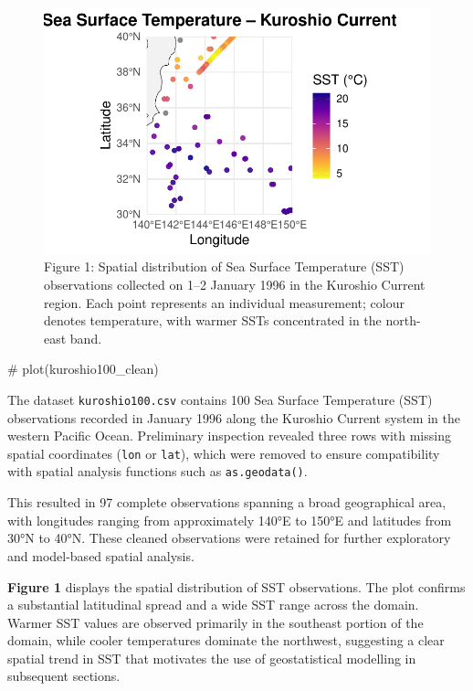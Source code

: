 \documentclass[
  11pt,
]{article}
\newenvironment{Shaded}{\begin{snugshade}}{\end{snugshade}}
\newcommand{\CommentTok}[1]{\textcolor[rgb]{0.37,0.37,0.37}{#1}}
\begin{document}
\begin{figure}[H]

{\centering \includegraphics{project_files/figure-pdf/fig-scatterplot-1.pdf}

}

\caption{Figure 1: Spatial distribution of Sea Surface Temperature (SST)
observations collected on 1--2 January 1996 in the Kuroshio Current
region. Each point represents an individual measurement; colour denotes
temperature, with warmer SSTs concentrated in the north-east band.}

\end{figure}%

\begin{Shaded}
\begin{Highlighting}[]
\CommentTok{\# plot(kuroshio100\_clean)}
\end{Highlighting}
\end{Shaded}

The dataset \texttt{kuroshio100.csv} contains 100 Sea Surface
Temperature (SST) observations recorded in January 1996 along the
Kuroshio Current system in the western Pacific Ocean. Preliminary
inspection revealed three rows with missing spatial coordinates
(\texttt{lon} or \texttt{lat}), which were removed to ensure
compatibility with spatial analysis functions such as
\texttt{as.geodata()}.

This resulted in 97 complete observations spanning a broad geographical
area, with longitudes ranging from approximately 140°E to 150°E and
latitudes from 30°N to 40°N. These cleaned observations were retained
for further exploratory and model-based spatial analysis.

\textbf{Figure 1} displays the spatial distribution of SST observations.
The plot confirms a substantial latitudinal spread and a wide SST range
across the domain. Warmer SST values are observed primarily in the
southeast portion of the domain, while cooler temperatures dominate the
northwest, suggesting a clear spatial trend in SST that motivates the
use of geostatistical modelling in subsequent sections.
\end{document}
